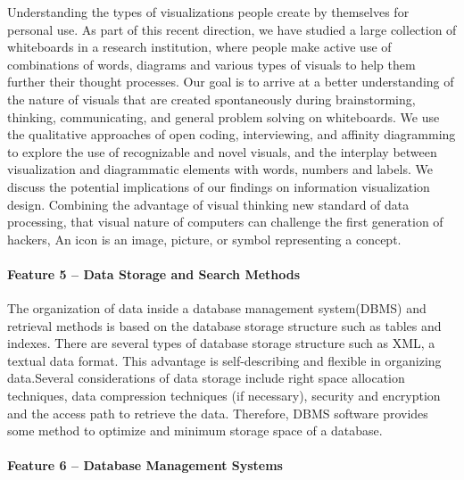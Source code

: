 Understanding the types of visualizations people create by themselves for personal use. As part of this recent direction, we have studied a large collection of whiteboards in a research institution, where people make active use of combinations of words, diagrams and various types of visuals to help them further their thought processes. Our goal is to arrive at a better understanding of the nature of visuals that are created spontaneously during brainstorming, thinking, communicating, and general problem solving on whiteboards.\cite{Blascheck2016} We use the qualitative approaches of open coding, interviewing, and affinity diagramming to explore the use of recognizable and novel visuals, and the interplay between visualization and diagrammatic elements with words, numbers and labels. We discuss the potential implications of our findings on information visualization design. Combining the advantage of visual thinking new standard of data processing, that visual nature of computers can challenge the first generation of hackers, An icon is an image, picture, or symbol representing a concept.\cite{Szpunar2010}
	
\paragraph*{Feature 5 -- Data Storage and Search Methods}
\label{task1:feature5}

The organization of data inside a database management system(DBMS) and retrieval methods is based on the database storage structure such as tables and indexes. 
There are several types of database storage structure such as XML, a textual data format. 
This advantage is self-describing and flexible in organizing data.\cite{ISI:000253400700005}Several considerations of data storage include right space allocation techniques, data compression techniques (if necessary), security and encryption and the access path to retrieve the data. 
Therefore, DBMS software provides some method to optimize and  minimum storage space of a database.

\paragraph*{Feature 6 -- Database Management Systems}
\label{task1:feature6}
	
